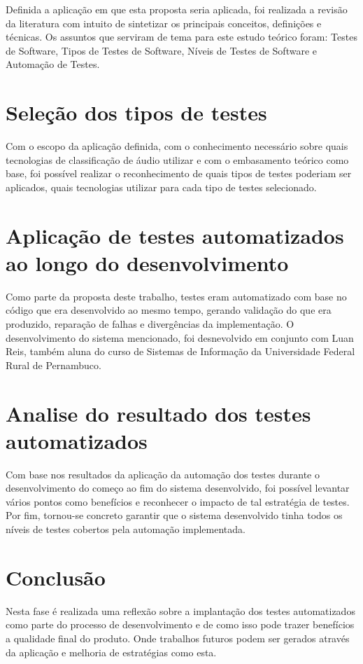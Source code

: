 Definida a aplicação em que esta proposta seria aplicada, foi realizada a revisão da literatura com intuito de sintetizar os principais conceitos, definições e técnicas. Os assuntos que serviram de tema para este estudo teórico foram: Testes de Software, Tipos de Testes de Software, Níveis de Testes de Software e Automação de Testes.

\section{Seleção dos tipos de testes}

Com o escopo da aplicação definida, com o conhecimento necessário sobre quais tecnologias de classificação de áudio utilizar e com o embasamento teórico como base, foi possível realizar o reconhecimento de quais tipos de testes poderiam ser aplicados, quais tecnologias utilizar para cada tipo de testes selecionado. 

\section{Aplicação de testes automatizados ao longo do desenvolvimento}

Como parte da proposta deste trabalho, testes eram automatizado com base no código que era desenvolvido ao mesmo tempo, gerando validação do que era produzido, reparação de falhas e divergências da implementação. O desenvolvimento do sistema mencionado, foi desnevolvido em conjunto com Luan Reis, também aluna do curso de Sistemas de Informação da Universidade Federal Rural de Pernambuco.

\section{Analise do resultado dos testes automatizados}

Com base nos resultados da aplicação da automação dos testes durante o desenvolvimento do começo ao fim do sistema desenvolvido, foi possível levantar vários pontos como benefícios e reconhecer o impacto de tal estratégia de testes. Por fim, tornou-se concreto garantir que o sistema desenvolvido tinha todos os níveis de testes cobertos pela automação implementada. 

\section{Conclusão}

Nesta fase é realizada uma reflexão sobre a implantação dos testes automatizados como parte do processo de desenvolvimento e de como isso pode trazer benefícios a qualidade final do produto.  Onde trabalhos futuros podem ser gerados através da aplicação e melhoria de estratégias como esta. 